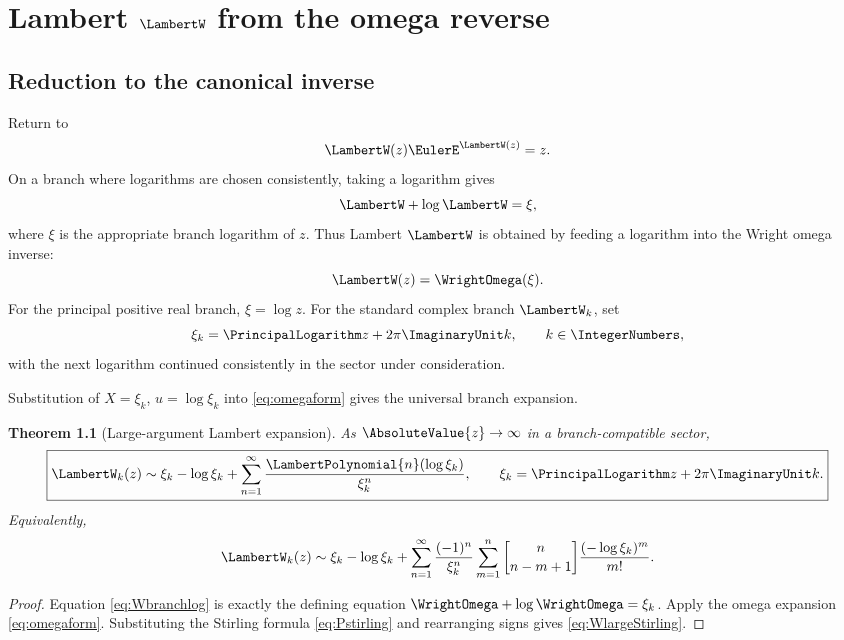 \documentclass[11pt,oneside,openany]{book}
\newtheorem{theorem}{Theorem}[chapter]
\newcommand{\UnsignedStirlingFirstKind}[2]{%
  \genfrac{[}{]}{0pt}{}{#1}{#2}%
}
\begin{document}
\chapter{Lambert \texorpdfstring{\(\LambertW\)}{W} from the omega reverse}
\label{ch:lambert}

\section{Reduction to the canonical inverse}
Return to
\[
 \LambertW(z)\EulerE^{\LambertW(z)}=z.
\]
On a branch where logarithms are chosen consistently, taking a logarithm gives
\begin{equation}\label{eq:Wbranchlog}
 \LambertW+\log \LambertW=\xi,
\end{equation}
where \(\xi\) is the appropriate branch logarithm of \(z\).  Thus Lambert
\(\LambertW\) is obtained by feeding a logarithm into the Wright omega inverse:
\begin{equation}\label{eq:Womega}
 \LambertW(z)=\WrightOmega(\xi).
\end{equation}
For the principal positive real branch, \(\xi=\log z\).  For the standard
complex branch \(\LambertW_k\), set
\begin{equation}\label{eq:xik}
 \xi_k=\PrincipalLogarithm z+2\pi\ImaginaryUnit k,
 \qquad k\in\IntegerNumbers,
\end{equation}
with the next logarithm continued consistently in the sector under
consideration.

Substitution of \(X=\xi_k\), \(u=\log\xi_k\) into
\cref{eq:omegaform} gives the universal branch expansion.

\begin{theorem}[Large-argument Lambert expansion]\label{thm:Wlarge}
As \(\AbsoluteValue{z}\to\infty\) in a branch-compatible sector,
\begin{equation}\label{eq:WlargePn}
 \boxed{
 \LambertW_k(z)\sim
 \xi_k-\log\xi_k+
 \sum_{n=1}^{\infty}
 \frac{\LambertPolynomial{n}(\log\xi_k)}{\xi_k^n},
 \qquad
 \xi_k=\PrincipalLogarithm z+2\pi\ImaginaryUnit k.
 }
\end{equation}
Equivalently,
\begin{equation}\label{eq:WlargeStirling}
 \LambertW_k(z)\sim\xi_k-\log\xi_k+
 \sum_{n=1}^{\infty}\frac{(-1)^n}{\xi_k^n}
 \sum_{m=1}^{n}
 \UnsignedStirlingFirstKind{n}{n-m+1}
 \frac{(-\log\xi_k)^m}{m!}.
\end{equation}
\end{theorem}

\begin{proof}
Equation \cref{eq:Wbranchlog} is exactly the defining equation
\(\WrightOmega+\log\WrightOmega=\xi_k\).  Apply the omega expansion
\cref{eq:omegaform}.  Substituting the Stirling formula
\cref{eq:Pstirling} and rearranging signs gives
\cref{eq:WlargeStirling}.
\end{proof}
\end{document}
